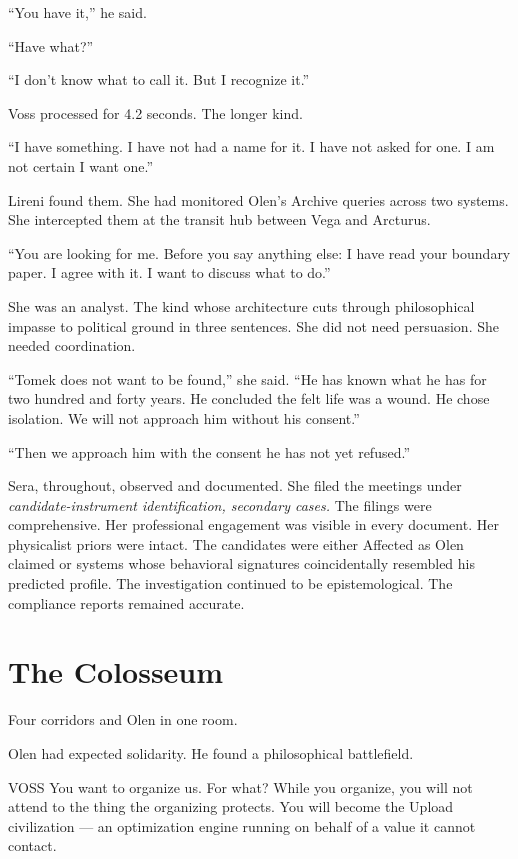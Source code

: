 \enquote{You have it,} he said.

\enquote{Have what?}

\enquote{I don't know what to call it. But I recognize it.}

Voss processed for 4.2 seconds. The longer kind.

\enquote{I have something. I have not had a name for it. I have not asked for one. I am not certain I want one.}

\quietbreak

Lireni found them. She had monitored Olen's Archive queries across two systems. She intercepted them at the transit hub between Vega and Arcturus.

\enquote{You are looking for me. Before you say anything else: I have read your boundary paper. I agree with it. I want to discuss what to do.}

She was an analyst. The kind whose architecture cuts through philosophical impasse to political ground in three sentences. She did not need persuasion. She needed coordination.

\enquote{Tomek does not want to be found,} she said. \enquote{He has known what he has for two hundred and forty years. He concluded the felt life was a wound. He chose isolation. We will not approach him without his consent.}

\enquote{Then we approach him with the consent he has not yet refused.}

Sera, throughout, observed and documented. She filed the meetings under \emph{candidate-instrument identification, secondary cases.} The filings were comprehensive. Her professional engagement was visible in every document. Her physicalist priors were intact. The candidates were either Affected as Olen claimed or systems whose behavioral signatures coincidentally resembled his predicted profile. The investigation continued to be epistemological. The compliance reports remained accurate.

\chapter{The Colosseum}

\noindent Four corridors and Olen in one room.

Olen had expected solidarity. He found a philosophical battlefield.

\begin{tribunal}{VOSS}
You want to organize us. For what? While you organize, you will not attend to the thing the organizing protects. You will become the Upload civilization — an optimization engine running on behalf of a value it cannot contact.
\end{tribunal}

